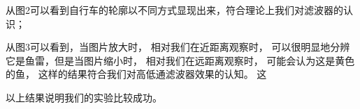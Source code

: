 从图2可以看到自行车的轮廓以不同方式显现出来，符合理论上我们对滤波器的认识；

从图3可以看到，当图片放大时，
相对我们在近距离观察时，
可以很明显地分辨它是鱼雷，但是当图片缩小时，
相对我们在远距离观察时，
可能会认为这是黄色的鱼，
这样的结果符合我们对高低通滤波器效果的认知。
这

以上结果说明我们的实验比较成功。